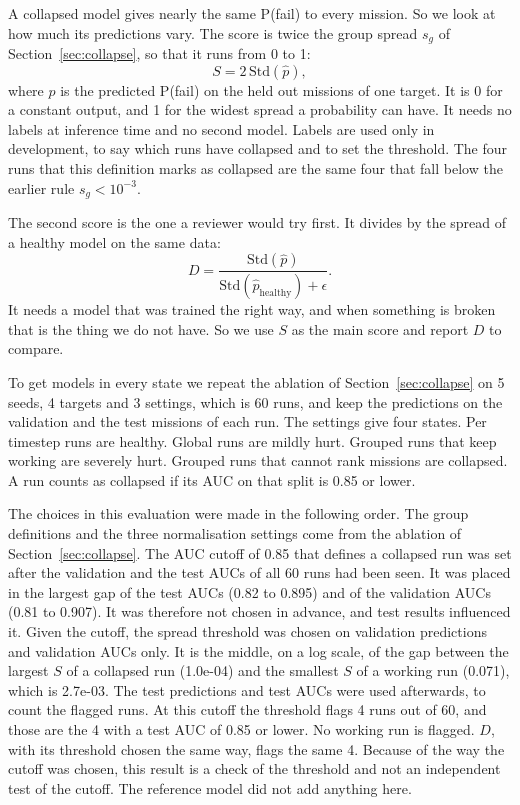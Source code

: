 \documentclass[preprint,12pt,authoryear]{elsarticle}
\begin{document}
A collapsed model gives nearly the same P(fail) to every mission. So we look at how much its predictions vary. The score is twice the group spread $s_g$ of Section~\ref{sec:collapse}, so that it runs from 0 to 1:
\begin{equation}
S = 2\,\mathrm{Std}(\hat{p}),
\end{equation}
where $\hat{p}$ is the predicted P(fail) on the held out missions of one target. It is 0 for a constant output, and 1 for the widest spread a probability can have. It needs no labels at inference time and no second model. Labels are used only in development, to say which runs have collapsed and to set the threshold. The four runs that this definition marks as collapsed are the same four that fall below the earlier rule $s_g<10^{-3}$.

The second score is the one a reviewer would try first. It divides by the spread of a healthy model on the same data:
\begin{equation}
D = \frac{\mathrm{Std}(\hat{p})}{\mathrm{Std}(\hat{p}_{\mathrm{healthy}}) + \epsilon}.
\end{equation}
It needs a model that was trained the right way, and when something is broken that is the thing we do not have. So we use $S$ as the main score and report $D$ to compare.

To get models in every state we repeat the ablation of Section~\ref{sec:collapse} on 5 seeds, 4 targets and 3 settings, which is 60 runs, and keep the predictions on the validation and the test missions of each run. The settings give four states. Per timestep runs are healthy. Global runs are mildly hurt. Grouped runs that keep working are severely hurt. Grouped runs that cannot rank missions are collapsed. A run counts as collapsed if its AUC on that split is 0.85 or lower.

The choices in this evaluation were made in the following order. The group definitions and the three normalisation settings come from the ablation of Section~\ref{sec:collapse}. The AUC cutoff of 0.85 that defines a collapsed run was set after the validation and the test AUCs of all 60 runs had been seen. It was placed in the largest gap of the test AUCs (0.82 to 0.895) and of the validation AUCs (0.81 to 0.907). It was therefore not chosen in advance, and test results influenced it. Given the cutoff, the spread threshold was chosen on validation predictions and validation AUCs only. It is the middle, on a log scale, of the gap between the largest $S$ of a collapsed run (1.0e-04) and the smallest $S$ of a working run (0.071), which is 2.7e-03. The test predictions and test AUCs were used afterwards, to count the flagged runs. At this cutoff the threshold flags 4 runs out of 60, and those are the 4 with a test AUC of 0.85 or lower. No working run is flagged. $D$, with its threshold chosen the same way, flags the same 4. Because of the way the cutoff was chosen, this result is a check of the threshold and not an independent test of the cutoff. The reference model did not add anything here.
\end{document}
